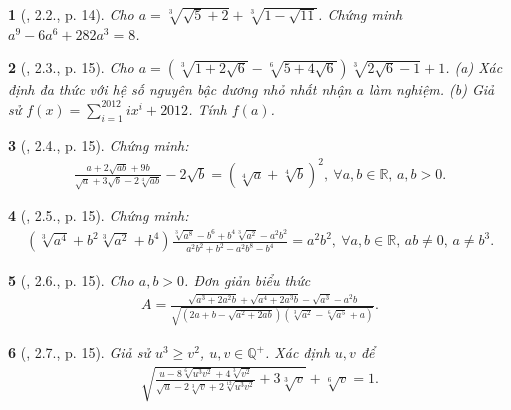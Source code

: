 \documentclass{article}
\newtheorem{baitoan}{}
\begin{document}
\begin{baitoan}[\cite{TLCT_THCS_Toan_9_dai_so}, 2.2., p. 14]
	Cho $a = \sqrt[3]{\sqrt{5} + 2} + \sqrt[3]{1 - \sqrt{11}}$. Chứng minh $a^9 - 6a^6 + 282a^3 = 8$.
\end{baitoan}

\begin{baitoan}[\cite{TLCT_THCS_Toan_9_dai_so}, 2.3., p. 15]
	Cho $a = (\sqrt[3]{1 + 2\sqrt{6}} - \sqrt[6]{5 + 4\sqrt{6}})\sqrt[3]{2\sqrt{6} - 1} + 1$. (a) Xác định đa thức với hệ số nguyên bậc dương nhỏ nhất nhận $a$ làm nghiệm. (b) Giả sử $f(x) = \sum_{i=1}^{2012} ix^i + 2012$. Tính $f(a)$.
\end{baitoan}

\begin{baitoan}[\cite{TLCT_THCS_Toan_9_dai_so}, 2.4., p. 15]
	Chứng minh:
	\begin{align*}
		\frac{a + 2\sqrt{ab} + 9b}{\sqrt{a} + 3\sqrt{b} - 2\sqrt[4]{ab}} - 2\sqrt{b} = \left(\sqrt[4]{a} + \sqrt[4]{b}\right)^2,\ \forall a,b\in\mathbb{R},\,a,b > 0.
	\end{align*}
\end{baitoan}

\begin{baitoan}[\cite{TLCT_THCS_Toan_9_dai_so}, 2.5., p. 15]
	Chứng minh:
	\begin{align*}
		\left(\sqrt[3]{a^4} + b^2\sqrt[3]{a^2} + b^4\right)\frac{\sqrt[3]{a^8} - b^6 + b^4\sqrt[3]{a^2} - a^2b^2}{a^2b^2 + b^2 - a^2b^8 - b^4} = a^2b^2,\ \forall a,b\in\mathbb{R},\,ab\ne0,\,a\ne b^3.
	\end{align*}
\end{baitoan}

\begin{baitoan}[\cite{TLCT_THCS_Toan_9_dai_so}, 2.6., p. 15]
	Cho $a,b > 0$. Đơn giản biểu thức
	\begin{align*}
		A = \frac{\sqrt{a^3 + 2a^2b} + \sqrt{a^4 + 2a^3b} - \sqrt{a^3} - a^2b}{\sqrt{\left(2a + b - \sqrt{a^2 + 2ab}\right)\left(\sqrt[3]{a^2} - \sqrt[6]{a^5} + a\right)}}.
	\end{align*}
\end{baitoan}

\begin{baitoan}[\cite{TLCT_THCS_Toan_9_dai_so}, 2.7., p. 15]
	Giả sử $u^3\ge v^2$, $u,v\in\mathbb{Q}^+$. Xác định $u,v$ để
	\begin{align*}
		\sqrt{\frac{u - 8\sqrt[6]{u^3v^2} + 4\sqrt[3]{v^2}}{\sqrt{u} - 2\sqrt[3]{v} + 2\sqrt[12]{u^3v^2}} + 3\sqrt[3]{v}} + \sqrt[6]{v} = 1.
	\end{align*}
\end{baitoan}
\end{document}
